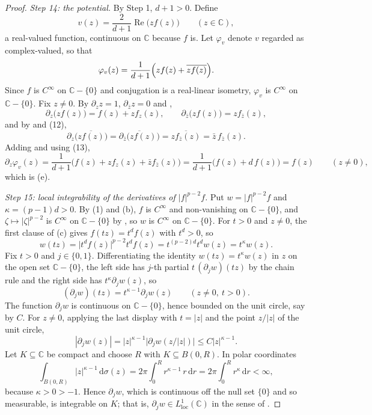 \begin{proof}
\emph{Step 14: the potential.}  By Step 1, $d+1>0$.  Define
\[
  v(z)=\frac{2}{d+1}\operatorname{Re}\bigl(z f(z)\bigr)\qquad(z\in\mathbb{C}),
\]
a real-valued function, continuous on $\mathbb{C}$ because $f$ is.  Let
$\varphi_v$ denote $v$ regarded as complex-valued, so that
\[
  \varphi_v(z)=\frac{1}{d+1}\Bigl(z f(z)+\overline{z f(z)}\Bigr).
\]
Since $f$ is $C^\infty$ on $\mathbb{C}-\{0\}$ and conjugation is a real-linear
isometry, $\varphi_v$ is $C^\infty$ on $\mathbb{C}-\{0\}$.  Fix $z\neq0$.  By
$\partial_z z=1$, $\partial_{\bar z}z=0$ and
,
\[
  \partial_z\bigl(zf(z)\bigr)=f(z)+zf_z(z),\qquad
  \partial_{\bar z}\bigl(zf(z)\bigr)=z f_{\bar z}(z),
\]
and by  and (12),
\[
  \partial_z\overline{\bigl(zf(z)\bigr)}
  =\overline{\partial_{\bar z}\bigl(zf(z)\bigr)}
  =\overline{z f_{\bar z}(z)}=\bar z\,f_{\bar z}(z).
\]
Adding and using (13),
\begin{equation}\tag{14}
  \partial_z\varphi_v(z)=\frac{1}{d+1}
    \bigl(f(z)+zf_z(z)+\bar z f_{\bar z}(z)\bigr)
  =\frac{1}{d+1}\bigl(f(z)+d\,f(z)\bigr)=f(z)\qquad(z\neq0),
\end{equation}
which is (e).

\emph{Step 15: local integrability of the derivatives of $|f|^{p-2}f$.}  Put
$w=|f|^{p-2}f$ and $\kappa=(p-1)d>0$.  By (1) and (b), $f$ is $C^\infty$ and
non-vanishing on $\mathbb{C}-\{0\}$, and $\zeta\mapsto|\zeta|^{p-2}$ is
$C^\infty$ on $\mathbb{C}-\{0\}$ by , so $w$
is $C^\infty$ on $\mathbb{C}-\{0\}$.  For $t>0$ and $z\neq0$, the first clause
of (c) gives $f(tz)=t^{d}f(z)$ with $t^{d}>0$, so
\[
  w(tz)=\bigl|t^{d}f(z)\bigr|^{p-2}t^{d}f(z)=t^{(p-2)d}t^{d}w(z)
  =t^{\kappa}w(z).
\]
Fix $t>0$ and $j\in\{0,1\}$.  Differentiating the identity
$w(tz)=t^{\kappa}w(z)$ in $z$ on the open set $\mathbb{C}-\{0\}$, the left side
has $j$-th partial $t\,(\partial_jw)(tz)$ by the chain rule and the right side
has $t^{\kappa}\partial_jw(z)$, so
\[
  (\partial_jw)(tz)=t^{\kappa-1}\partial_jw(z)\qquad(z\neq0,\ t>0).
\]
The function $\partial_jw$ is continuous on $\mathbb{C}-\{0\}$, hence bounded on
the unit circle, say by $C$.  For $z\neq0$, applying the last display with
$t=|z|$ and the point $z/|z|$ of the unit circle,
\[
  |\partial_jw(z)|=|z|^{\kappa-1}\bigl|\partial_jw(z/|z|)\bigr|
  \le C|z|^{\kappa-1}.
\]
Let $K\subseteq\mathbb{C}$ be compact and choose $R$ with
$K\subseteq B(0,R)$.  In polar coordinates
\[
  \int_{B(0,R)}|z|^{\kappa-1}\,\mathrm{d}\sigma(z)
  =2\pi\int_0^{R}r^{\kappa-1}\,r\,\mathrm{d}r
  =2\pi\int_0^{R}r^{\kappa}\,\mathrm{d}r<\infty,
\]
because $\kappa>0>-1$.  Hence $\partial_jw$, which is continuous off the null
set $\{0\}$ and so measurable, is integrable on $K$; that is,
$\partial_jw\in L^1_{\mathrm{loc}}(\mathbb{C})$ in the sense of
.


\end{proof}
